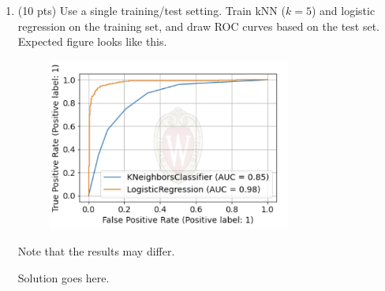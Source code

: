\documentclass[a4paper]{article}
\theoremstyle{definition}
\newenvironment{soln}{
    \leavevmode\color{blue}\ignorespaces
}{}
\begin{document}
\begin{enumerate}
	\item (10 pts) Use a single training/test setting. Train kNN ($k=5$) and logistic regression on the training set, and draw ROC curves based on the test set. \\
	Expected figure looks like this.
	\begin{figure}[h!]
		\centering
		\includegraphics[width=8cm]{roc.png}
	\end{figure}
	Note that the results may differ.
	
	\begin{soln}  Solution goes here. \end{soln}
	
\end{enumerate}

\end{document}
